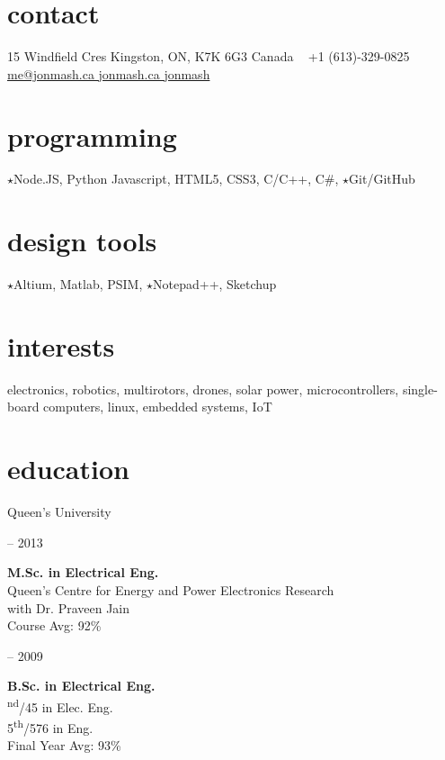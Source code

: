 
\begin{aside}
%
\section{contact}
15 Windfield Cres
Kingston, ON, K7K 6G3
Canada
~
+1 (613)-329-0825
~
\href{mailto:me@jonmash.ca}{me@jonmash.ca \faEnvelope}
\href{http://www.jonmash.ca}{jonmash.ca \faLink}
\href{https://github.com/jonmash}{jonmash \faGithub}
%
\section{programming}
{\color{orange} $\star$}Node.JS, Python
Javascript, HTML5, CSS3, C/C++, C\#,
{\color{orange} $\star$}Git/GitHub
%
\section{design tools}
{\color{orange} $\star$}Altium, Matlab, PSIM, {\color{orange} $\star$}Notepad++, Sketchup
%
\section{interests}
electronics, robotics, multirotors, drones, solar power, microcontrollers, single-board computers, linux, embedded systems, IoT
%
\section{education}
\restorecr
{\headingfont Queen's University}
\begin{center}
{ -- 2013} \\
\end{center}
\textbf{M.Sc. {\normalfont in Electrical Eng.}}\\
{\bodyfontit Queen’s Centre for Energy and Power Electronics Research}\\
with Dr. Praveen Jain\\
Course Avg: 92\%\\
\vspace{0.3cm}
\begin{center}
{ -- 2009} \\
\end{center}
\textbf{B.Sc. {\normalfont in Electrical Eng.}}\\
{\textsuperscript{nd}/45 in Elec. Eng. \\ 5\textsuperscript{th}/576 in Eng.}\\
Final Year Avg: 93\%\\
\obeycr
\end{aside}